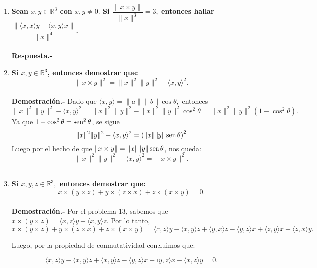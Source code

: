 \begin{enumerate}
    \item \textbf{\boldmath Sean $x,y\in \mathbb{R}^3$ con $x,y\neq 0.$ Si $\dfrac{\|x\times y\|}{\|x\|^3}=3,$ entonces hallar $\dfrac{\| \langle x,x\rangle y - \langle x,y\rangle x \|}{\|x\|^4}$.\\\\
	Respuesta.-}\;

    \item \textbf{\boldmath Si $x,y\in \mathbb{R}^3$, entonces demostrar que:
    $$\|x\times y\|^2 = \|x\|^2 \|y\|^2 - \langle x,y \rangle^2.$$\\
	Demostración.-}\;
	Dado que $\langle x,y\rangle =\|a\|\|b\|\cos \theta,$ entonces
	$$\|x\|^2\|y\|^2-\langle x, y\rangle^2=\|x\|^2\|y\|^2-\|x\|^2\|y\|^2\cos^2\theta = \|x\|^2\|y\|^2\left(1-\cos^2 \theta\right).$$
	Ya que $1-\cos^2\theta = \mathop{\mbox{\normalfont sen}}\nolimits^2\theta$, se sigue
	$$\|x\|^2\|y\|^2-\langle x, y\rangle^2=\left(\|x\|\|y\|\mathop{\mbox{\normalfont sen}}\nolimits \theta\right)^2$$
	Luego por el hecho de que $\|x\times y\|=\|x\|\|y\|\mathop{\mbox{\normalfont sen}}\nolimits \theta$, nos queda:
	$$\|x\|^2\|y\|^2-\langle x, y\rangle^2=\|x\times y\|^2.$$\\
	


    \item \textbf{\boldmath Si $x,y,z \in \mathbb{R}^3,$ entonces demostrar que:
    $$x\times (y\times z) + y \times (z\times x)+z\times(x\times y)=0.$$\\
	Demostración.-}\; Por el problema 13, sabemos que $x\times (y \times z) = \langle x,z\rangle y - \langle x,y\rangle z$. Por lo tanto,
	$$x\times (y\times z) + y \times (z\times x)+z\times(x\times y) = \langle x,z\rangle y- \langle x,y\rangle z + \langle y,x\rangle z -\langle y,z \rangle x +\langle z,y\rangle x -\langle z,x\rangle y.$$

	Luego, por la propiedad de conmutatividad concluimos que:

	$$\langle x,z\rangle y- \langle x,y\rangle z + \langle x,y\rangle z -\langle y,z \rangle x +\langle y,z\rangle x -\langle x,z\rangle y = 0.$$\\

\end{enumerate}
